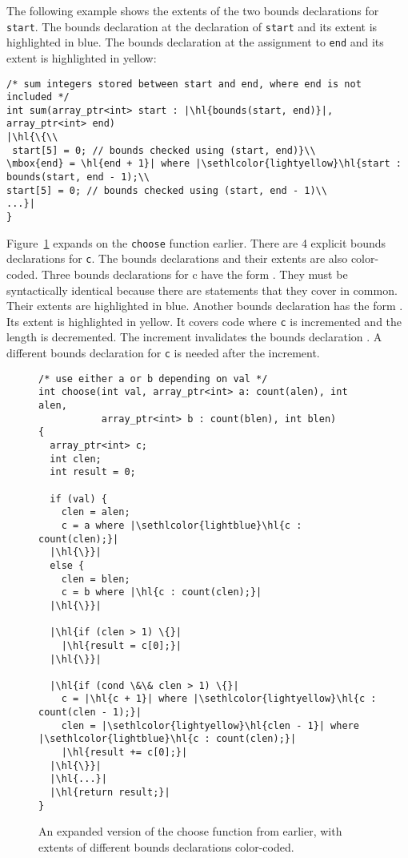 The following example shows the extents of the two bounds declarations for
\texttt{start}.  The bounds declaration at the declaration of \texttt{start} and 
its extent is highlighted in blue. The bounds declaration at the assignment 
to \texttt{end} and its extent is highlighted in yellow:

\begin{lstlisting}[escapechar=\|]
/* sum integers stored between start and end, where end is not included */  
int sum(array_ptr<int> start : |\hl{bounds(start, end)}|, array_ptr<int> end)
|\hl{\{\\
 start[5] = 0; // bounds checked using (start, end)}\\
\mbox{end} = \hl{end + 1}| where |\sethlcolor{lightyellow}\hl{start : bounds(start, end - 1);\\
start[5] = 0; // bounds checked using (start, end - 1)\\
...}|
}
\end{lstlisting}

Figure~\ref{fig:bounds-extent:choose} expands on the \texttt{choose} function earlier. 
There are 4 explicit bounds declarations for \texttt{c}. The bounds declarations
and their extents are also color-coded. Three bounds declarations for c
have the form . They must be syntactically
identical because there are statements that they cover in common. Their
extents are highlighted in blue.  Another bounds declaration has
the form .   Its extent is highlighted
in yellow. It covers code where \texttt{c} is incremented and the 
length is decremented.  The increment invalidates the bounds declaration
.  A different bounds declaration for \texttt{c}
is needed after the increment.

\begin{figure}
\begin{lstlisting}[escapechar=\|]
/* use either a or b depending on val */
int choose(int val, array_ptr<int> a: count(alen), int alen,
           array_ptr<int> b : count(blen), int blen)
{
  array_ptr<int> c;
  int clen;
  int result = 0;

  if (val) {
    clen = alen;
    c = a where |\sethlcolor{lightblue}\hl{c : count(clen);}|
  |\hl{\}}|
  else {
    clen = blen;
    c = b where |\hl{c : count(clen);}|
  |\hl{\}}|
  
  |\hl{if (clen > 1) \{}|
    |\hl{result = c[0];}|
  |\hl{\}}|
  
  |\hl{if (cond \&\& clen > 1) \{}|
    c = |\hl{c + 1}| where |\sethlcolor{lightyellow}\hl{c : count(clen - 1);}|
    clen = |\sethlcolor{lightyellow}\hl{clen - 1}| where |\sethlcolor{lightblue}\hl{c : count(clen);}|
    |\hl{result += c[0];}|
  |\hl{\}}| 
  |\hl{...}|
  |\hl{return result;}|
}
\end{lstlisting}
\caption{An expanded version of the choose function from earlier, with extents of different bounds declarations color-coded.}
\label{fig:bounds-extent:choose}
\end{figure}

